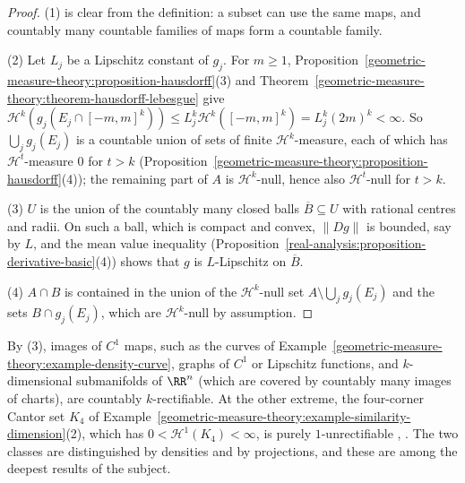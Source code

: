 \begin{proof}
(1) is clear from the definition: a subset can use the same maps, and countably many countable families of maps form a countable family.

(2) Let $L_j$ be a Lipschitz constant of $g_j$. For $m \geq 1$, Proposition~\ref{geometric-measure-theory:proposition-hausdorff}(3) and Theorem~\ref{geometric-measure-theory:theorem-hausdorff-lebesgue} give
$\mathcal{H}^k(g_j(E_j \cap [-m, m]^k)) \leq L_j^k\mathcal{H}^k([-m, m]^k) = L_j^k(2m)^k < \infty$. So $\bigcup_jg_j(E_j)$ is a countable union of sets of finite $\mathcal{H}^k$-measure, each of which has
$\mathcal{H}^t$-measure $0$ for $t > k$ (Proposition~\ref{geometric-measure-theory:proposition-hausdorff}(4)); the remaining part of $A$ is $\mathcal{H}^k$-null, hence also $\mathcal{H}^t$-null for $t > k$.

(3) $U$ is the union of the countably many closed balls $\overline{B} \subseteq U$ with rational centres and radii. On such a ball, which is compact and convex, $\|Dg\|$ is bounded, say by $L$, and the mean
value inequality (Proposition~\ref{real-analysis:proposition-derivative-basic}(4)) shows that $g$ is $L$-Lipschitz on $\overline{B}$.

(4) $A \cap B$ is contained in the union of the $\mathcal{H}^k$-null set $A \setminus \bigcup_jg_j(E_j)$ and the sets $B \cap g_j(E_j)$, which are $\mathcal{H}^k$-null by assumption.
\end{proof}

By (3), images of $C^1$ maps, such as the curves of Example~\ref{geometric-measure-theory:example-density-curve}, graphs of $C^1$ or Lipschitz functions, and $k$-dimensional submanifolds of $\RR^n$ (which are
covered by countably many images of charts), are countably $k$-rectifiable. At the other extreme, the four-corner Cantor set $K_4$ of Example~\ref{geometric-measure-theory:example-similarity-dimension}(2), which has
$0 < \mathcal{H}^1(K_4) < \infty$, is purely $1$-unrectifiable \cite{falconer-gofs}, \cite{mattila-1995}. The two classes are distinguished by densities and by projections, and these are among the
deepest results of the subject.

